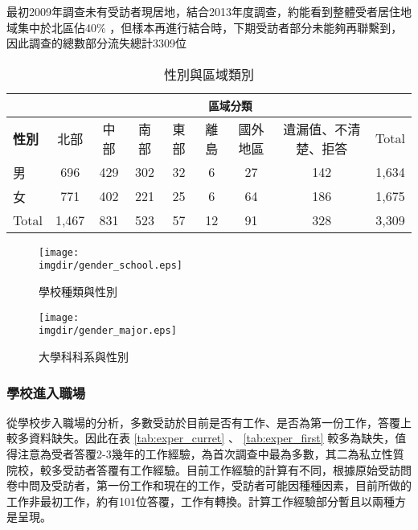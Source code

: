 \documentclass[12pt, a4paper]{article}
\begin{document}
最初2009年調查未有受訪者現居地，結合2013年度調查，約能看到整體受者居住地域集中於北區佔40\% ，但樣本再進行結合時，下期受訪者部分未能夠再聯繫到，因此調查的總數部分流失總計3309位
\begin{table}[htbp]
\centering
\caption{性別與區域類別}
\begin{adjustbox}{max width=\textwidth}
	\begin{tabular}{lcccccccc}
\toprule
 & \multicolumn{8}{c}{\texttt{區域分類}} \\
\midrule
\textbf{性別} & 北部 & 中部 & 南部 & 東部 & 離島 & 國外地區 & 遺漏值、不清楚、拒答 & Total \\
\midrule
男 & 696 & 429 & 302 & 32 & 6 & 27 & 142 & 1,634 \\
女 & 771 & 402 & 221 & 25 & 6 & 64 & 186 & 1,675 \\
Total & 1,467 & 831 & 523 & 57 & 12 & 91 & 328 & 3,309 \\
\bottomrule
	\end{tabular}
	\end{adjustbox}
\end{table}





\begin{figure}[h]
    \centering    
        \texttt{[image: \\imgdir/gender\_school.eps]}
        \caption{學校種類與性別}
        \label{pic:shcool_gender}
\end{figure}

\begin{figure}[h]
    \centering    
        \texttt{[image: \\imgdir/gender\_major.eps]}
        \caption{大學科科系與性別}
        \label{pic:major_gender}
\end{figure}




\clearpage
\subsubsection{學校進入職場}

從學校步入職場的分析，多數受訪於目前是否有工作、是否為第一份工作，答覆上較多資料缺失。因此在表 \ref{tab:exper_curret} 、 \ref{tab:exper_first} 較多為缺失，值得注意為受者答覆2-3幾年的工作經驗，為首次調查中最為多數，其二為私立性質院校，較多受訪者答覆有工作經驗。目前工作經驗的計算有不同，根據原始受訪問卷中問及受訪者，第一份工作和現在的工作，受訪者可能因種種因素，目前所做的工作非最初工作，約有101位答覆，工作有轉換。計算工作經驗部分暫且以兩種方是呈現。
\end{document}
